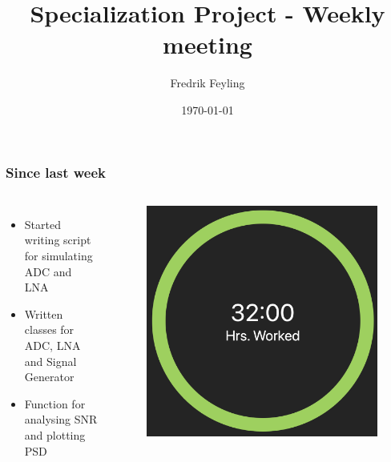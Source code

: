 \documentclass[xcolor={table}]{beamer}
\title{Specialization Project - Weekly meeting}
\author{Fredrik Feyling}
\date{\today}
\begin{document}
\frame{\titlepage}

\begin{frame}
\frametitle{Since last week}
\begin{columns}

\begin{itemize}
\item Started writing script for simulating ADC and LNA
\item Written classes for ADC, LNA and Signal Generator
\item Function for analysing SNR and plotting PSD
\end{itemize}

\begin{figure}[htbp]
\begin{center}
\includegraphics[width=0.5\linewidth]{TYME_TOT}
\end{center}
\end{figure}

\end{columns}
\end{frame}
\end{document}
